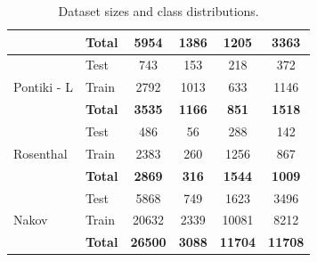 \documentclass[12pt, a4paper]{report}
\theoremstyle{definition}
\theoremstyle{definition}%
\theoremstyle{definition}%
\theoremstyle{definition}%
\theoremstyle{definition}%
\theoremstyle{definition}%
\begin{document}
\begin{table}
\begin{tabular}{|l|l|c|ccc|}
		                                       & \textbf{Total}                      & \textbf{5954}    & \textbf{1386}     & \textbf{1205}    & \textbf{3363}     \\ \hline\hline
		\multirow{3}{*}{Pontiki - L}           & Test                                & 743              & 153               & 218              & 372               \\
		                                       & Train                               & 2792             & 1013              & 633              & 1146              \\ \cline{2-6}
		                                       & \textbf{Total}                      & \textbf{3535}    & \textbf{1166}     & \textbf{851}     & \textbf{1518}     \\ \hline\hline
		\multirow{3}{*}{Rosenthal}             & Test                                & 486              & 56                & 288              & 142               \\
		                                       & Train                               & 2383             & 260               & 1256             & 867               \\ \cline{2-6}
		                                       & \textbf{Total}                      & \textbf{2869}    & \textbf{316}      & \textbf{1544}    & \textbf{1009}     \\ \hline\hline
		\multirow{3}{*}{Nakov}                 & Test                                & 5868             & 749               & 1623             & 3496              \\
		                                       & Train                               & 20632            & 2339              & 10081            & 8212              \\ \cline{2-6}
		                                       & \textbf{Total}                      & \textbf{26500}   & \textbf{3088}     & \textbf{11704}   & \textbf{11708}    \\ \hline
	\end{tabular}
	\caption{Dataset sizes and class distributions. }
	\label{tab:dataset_class_dists}
\end{table}
\end{document}
